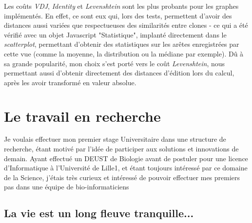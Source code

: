 \documentclass[pdftex,12pt,a4paper]{report}
\begin{document}
\begin{spacing}{1.2}
Les coûts \textit{VDJ}, \textit{Identity} et \textit{Levenshtein} sont les plus probants pour les graphes implémentés. En effet, ce sont eux qui, lors des tests, permettent d'avoir des distances aussi variées que respectueuses des similarités entre clones - ce qui a été vérifié avec un objet Javascript "Statistique", implanté directement dans le \textit{scatterplot}, permettant d'obtenir des statistiques sur les arêtes enregistrées par cette vue (comme la moyenne, la distribution ou la médiane par exemple).
\newline
Dû à sa grande popularité, mon choix s'est porté vers le coût \textit{Levenshtein}, nous permettant aussi d'obtenir directement des distances d'édition lors du calcul, après les avoir transformé en valeur absolue.

\chapter{Le travail en recherche}

Je voulais effectuer mon premier stage Universitaire dans une structure de recherche, étant motivé par l'idée de participer aux solutions et innovations de demain. Ayant effectué un DEUST de Biologie avant de postuler pour une licence d'Informatique à l'Université de Lille1, et étant toujours intéressé par ce domaine de la Science, j'étais très curieux et intéressé de pouvoir effectuer mes premiers pas dans une équipe de bio-informaticiens

\section{La vie est un long fleuve tranquille...}


\end{spacing}
\end{document}
